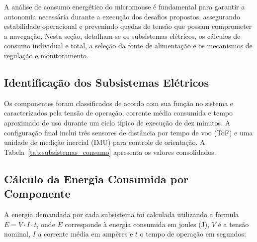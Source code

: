 A análise de consumo energético do micromouse é fundamental para garantir a autonomia necessária durante a execução dos desafios propostos, assegurando estabilidade operacional e prevenindo quedas de tensão que possam comprometer a navegação. Nesta seção, detalham-se os subsistemas elétricos, os cálculos de consumo individual e total, a seleção da fonte de alimentação e os mecanismos de regulação e monitoramento.

\subsection{Identificação dos Subsistemas Elétricos}

Os componentes foram classificados de acordo com sua função no sistema e caracterizados pela tensão de operação, corrente média consumida e tempo aproximado de uso durante um ciclo típico de execução de dez minutos. A configuração final inclui três sensores de distância por tempo de voo (ToF) e uma unidade de medição inercial (IMU) para controle de orientação. A Tabela~\ref{tab:subsistemas_consumo} apresenta os valores consolidados.

\begin{table}[htbp]
\centering
\caption{Caracterização dos subsistemas elétricos do micromouse.}
\label{tab:subsistemas_consumo}
\end{table}

\subsection{Cálculo da Energia Consumida por Componente}

A energia demandada por cada subsistema foi calculada utilizando a fórmula $E = V \cdot I \cdot t$, onde $E$ corresponde à energia consumida em joules (J), $V$ é a tensão nominal, $I$ a corrente média em ampères e $t$ o tempo de operação em segundos:

